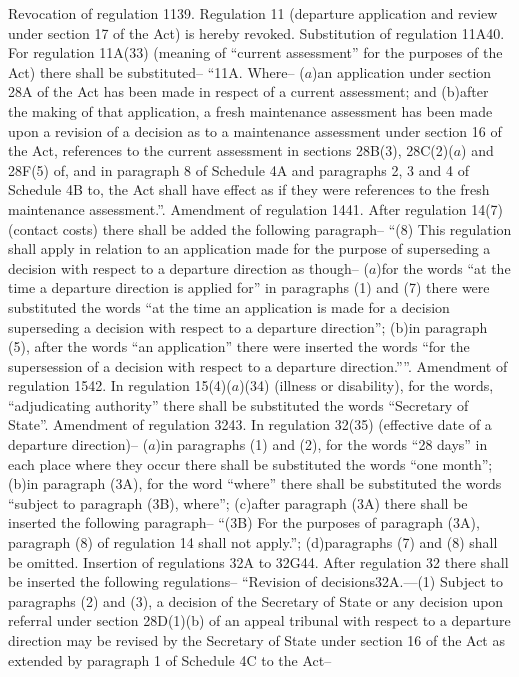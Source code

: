 \documentclass[12pt,a4paper]{article}
\begin{document}
Revocation of regulation 1139.  Regulation 11 (departure application and review under section 17 of the Act) is hereby revoked.
Substitution of regulation 11A40.  For regulation 11A(33) (meaning of “current assessment” for the purposes of the Act) there shall be substituted–
“11A.  Where–
($a$)an application under section 28A of the Act has been made in respect of a current assessment; and
(b)after the making of that application, a fresh maintenance assessment has been made upon a revision of a decision as to a maintenance assessment under section 16 of the Act,
references to the current assessment in sections 28B(3), 28C(2)($a$) and 28F(5) of, and in paragraph 8 of Schedule 4A and paragraphs 2, 3 and 4 of Schedule 4B to, the Act shall have effect as if they were references to the fresh maintenance assessment.”.
Amendment of regulation 1441.  After regulation 14(7) (contact costs) there shall be added the following paragraph–
“(8) This regulation shall apply in relation to an application made for the purpose of superseding a decision with respect to a departure direction as though–
($a$)for the words “at the time a departure direction is applied for” in paragraphs (1) and (7) there were substituted the words “at the time an application is made for a decision superseding a decision with respect to a departure direction”;
(b)in paragraph (5), after the words “an application” there were inserted the words “for the supersession of a decision with respect to a departure direction.””.
Amendment of regulation 1542.  In regulation 15(4)($a$)(34) (illness or disability), for the words, “adjudicating authority” there shall be substituted the words “Secretary of State”.
Amendment of regulation 3243.  In regulation 32(35) (effective date of a departure direction)–
($a$)in paragraphs (1) and (2), for the words “28 days” in each place where they occur there shall be substituted the words “one month”;
(b)in paragraph (3A), for the word “where” there shall be substituted the words “subject to paragraph (3B), where”;
(c)after paragraph (3A) there shall be inserted the following paragraph–
“(3B) For the purposes of paragraph (3A), paragraph (8) of regulation 14 shall not apply.”;
(d)paragraphs (7) and (8) shall be omitted.
Insertion of regulations 32A to 32G44.  After regulation 32 there shall be inserted the following regulations–
“Revision of decisions32A.—(1) Subject to paragraphs (2) and (3), a decision of the Secretary of State or any decision upon referral under section 28D(1)(b) of an appeal tribunal with respect to a departure direction may be revised by the Secretary of State under section 16 of the Act as extended by paragraph 1 of Schedule 4C to the Act–
\end{document}
